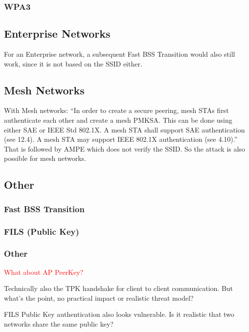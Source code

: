 \documentclass[sigconf,review]{acmart}
\DeclareRobustCommand{\red}[1]{\textcolor{red}{#1}}
\begin{document}
\subsubsection{WPA3}

\subsection{Enterprise Networks} %

For an Enterprise network, a subsequent Fast BSS Transition would also still work, since it is not based on the SSID either.

\subsection{Mesh Networks}

With Mesh networks: ``In order to create a secure peering, mesh STAs first authenticate each other and create a mesh PMKSA. This can be done using either SAE or IEEE Std 802.1X. A mesh STA shall support SAE authentication (see 12.4). A mesh STA may support IEEE 802.1X authentication (see 4.10).''
That is followed by AMPE which does not verify the SSID.
So the attack is also possible for mesh networks.

\subsection{Other}

\subsubsection{Fast BSS Transition}

\subsubsection{FILS (Public Key)}

\subsubsection{Other}

\red{What about AP PeerKey?}

Technically also the TPK handshake for client to client communication.
But what's the point, no practical impact or realistic threat model?

FILS Public Key authentication also looks vulnerable.
Is it realistic that two networks share the same public key?
\end{document}

